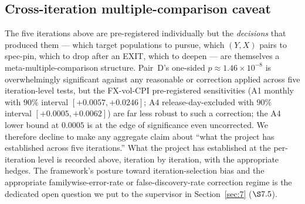 \subsection{Cross-iteration multiple-comparison caveat}\label{sec:6.6}

The five iterations above are pre-registered individually but the
\emph{decisions} that produced them --- which target populations to
pursue, which \((Y, X)\) pairs to spec-pin, which to drop after an
EXIT, which to deepen --- are themselves a meta-multiple-comparison
structure. Pair~D's one-sided \(p \approx 1.46 \times 10^{-8}\) is
overwhelmingly significant against any reasonable
\citet{benjaminihochberg1995} or \citet{romanowolf2005} correction
applied across five iteration-level tests, but the FX-vol-CPI
pre-registered sensitivities (A1 monthly with \(90\%\) interval
\([+0.0057, +0.0246]\); A4 release-day-excluded with \(90\%\) interval
\([+0.0005, +0.0062]\)) are far less robust to such a correction; the
A4 lower bound at \(0.0005\) is at the edge of significance even
uncorrected. We therefore decline to make any aggregate claim about
``what the project has established across five iterations.'' What the
project has established at the per-iteration level is recorded above,
iteration by iteration, with the appropriate hedges. The framework's
posture toward iteration-selection bias and the appropriate
familywise-error-rate or false-discovery-rate correction regime is
the dedicated open question we put to the supervisor in
Section~\ref{sec:7} (\(\S 7.5\)).
